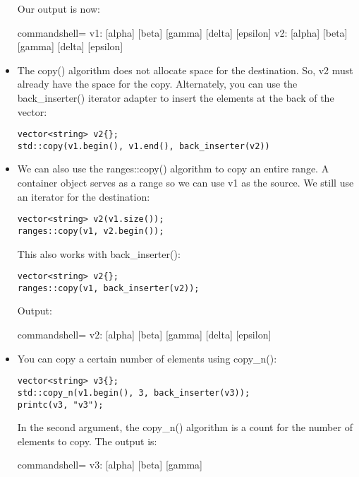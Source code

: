 \begin{itemize}
Our output is now:

\begin{tcblisting}{commandshell={}}
v1: [alpha] [beta] [gamma] [delta] [epsilon]
v2: [alpha] [beta] [gamma] [delta] [epsilon]
\end{tcblisting}

\item 
The copy() algorithm does not allocate space for the destination. So, v2 must already have the space for the copy. Alternately, you can use the back\_inserter() iterator adapter to insert the elements at the back of the vector:

\begin{lstlisting}[style=styleCXX]
vector<string> v2{};
std::copy(v1.begin(), v1.end(), back_inserter(v2))
\end{lstlisting}

\item 
We can also use the ranges::copy() algorithm to copy an entire range.
A container object serves as a range so we can use v1 as the source. We still use an iterator for the destination:

\begin{lstlisting}[style=styleCXX]
vector<string> v2(v1.size());
ranges::copy(v1, v2.begin());
\end{lstlisting}

This also works with back\_inserter():

\begin{lstlisting}[style=styleCXX]
vector<string> v2{};
ranges::copy(v1, back_inserter(v2));
\end{lstlisting}

Output:

\begin{tcblisting}{commandshell={}}
v2: [alpha] [beta] [gamma] [delta] [epsilon]
\end{tcblisting}

\item 
You can copy a certain number of elements using copy\_n():

\begin{lstlisting}[style=styleCXX]
vector<string> v3{};
std::copy_n(v1.begin(), 3, back_inserter(v3));
printc(v3, "v3");
\end{lstlisting}

In the second argument, the copy\_n() algorithm is a count for the number of elements to copy. The output is:

\begin{tcblisting}{commandshell={}}
v3: [alpha] [beta] [gamma]
\end{tcblisting}


\end{itemize}
